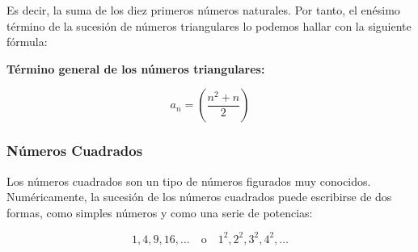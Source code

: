 \documentclass[12pt,a4paper]{article}
\begin{document}
Es decir, la suma de los diez primeros números naturales. Por tanto, el enésimo término de la sucesión de números triangulares lo podemos hallar con la siguiente fórmula:

\textbf{Término general de los números triangulares:}

\[ a_n = \left( \frac{n^2 + n}{2} \right) \]

\subsubsection*{Números Cuadrados}

Los números cuadrados son un tipo de números figurados muy conocidos. Numéricamente, la sucesión de los números cuadrados puede escribirse de dos formas, como simples números y como una serie de potencias:

\[ 1, 4, 9, 16, \ldots \quad \text{o} \quad 1^2, 2^2, 3^2, 4^2, \ldots \]

\begin{center}
\end{center}
\end{document}
